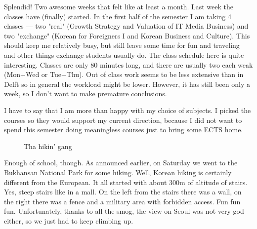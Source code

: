 
\begin{post}
	\begin{content}
Splendid! Two awesome weeks that felt like at least a month. Last week the classes have (finally) started. In the first half of the semester I am taking 4 classes — two "real" (Growth Strategy and Valuation of IT Media Business) and two "exchange" (Korean for Foreigners I and Korean Business and Culture). This should keep me relatively busy, but still leave some time for fun and traveling and other things exchange students usually do. The class schedule here is quite interesting. Classes are only 80 minutes long, and there are usually two each weak (Mon+Wed or Tue+Thu). Out of class work seems to be less extensive than in Delft so in general the workload might be lower. However, it has still been only a week, so I don't want to make premature conclusions.

I have to say that I am more than happy with my choice of subjects. I picked the courses so they would support my current direction, because I did not want to spend this semester doing meaningless courses just to bring some ECTS home.

\begin{figure}
\centering\vspace{-12pt}
\caption*{Tha hikin' gang}
\vspace{-25pt}
\end{figure}Enough of school, though. As announced earlier, on Saturday we went to the Bukhansan National Park for some hiking. Well, Korean hiking is certainly different from the European. It all started with about 300m of altitude of stairs. Yes, steep stairs like in a mall. On the left from the stairs there was a wall, on the right there was a fence and a military area with forbidden access. Fun fun fun. Unfortunately, thanks to all the smog, the view on Seoul was not very god either, so we just had to keep climbing up.



\end{content}
\end{post}

